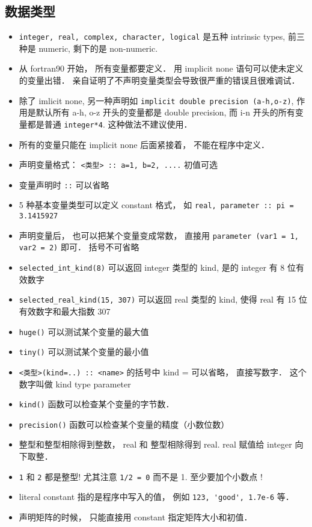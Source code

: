 \subsection{数据类型}
\begin{itemize}
\item \verb`integer, real, complex, character, logical` 是五种 intrinsic types, 前三种是 numeric, 剩下的是 non-numeric.
\item 从 fortran90 开始， 所有变量都要定义． 用 implicit none 语句可以使未定义的变量出错． 亲自证明了不声明变量类型会导致很严重的错误且很难调试．
\item 除了 imlicit none, 另一种声明如 \verb|implicit double precision (a-h,o-z)|, 作用是默认所有 a-h, o-z 开头的变量都是 double precision, 而 i-n 开头的所有变量都是普通 \verb|integer*4|. 这种做法不建议使用．
\item 所有的变量只能在 implicit none 后面紧接着， 不能在程序中定义．
\item 声明变量格式：  \verb`<类型> :: a=1, b=2, ....`  初值可选
\item 变量声明时 \verb`::` 可以省略
\item 5 种基本变量类型可以定义 constant 格式， 如  \verb`real, parameter :: pi = 3.1415927`
\item 声明变量后， 也可以把某个变量变成常数， 直接用 \verb|parameter (var1 = 1, var2 = 2)| 即可． 括号不可省略
\item \verb`selected_int_kind(8)` 可以返回 integer 类型的 kind, 是的 integer 有 8 位有效数字
\item \verb`selected_real_kind(15, 307)` 可以返回 real 类型的 kind, 使得 real 有 15 位有效数字和最大指数 307
\item \verb`huge()` 可以测试某个变量的最大值
\item \verb`tiny()` 可以测试某个变量的最小值
\item \verb`<类型>(kind=..) :: <name>` 的括号中 kind = 可以省略， 直接写数字． 这个数字叫做 kind type parameter
\item \verb`kind()` 函数可以检查某个变量的字节数．
\item \verb`precision()` 函数可以检查某个变量的精度（小数位数）
\item 整型和整型相除得到整数， real 和 整型相除得到 real. real 赋值给 integer 向下取整．
\item \verb`1` 和 \verb`2` 都是整型! 尤其注意 \verb`1/2 = 0` 而不是 1.   至少要加个小数点 !
\item literal constant 指的是程序中写入的值， 例如 \verb`123, 'good', 1.7e-6` 等．
\item 声明矩阵的时候， 只能直接用 constant 指定矩阵大小和初值．
\end{itemize}

